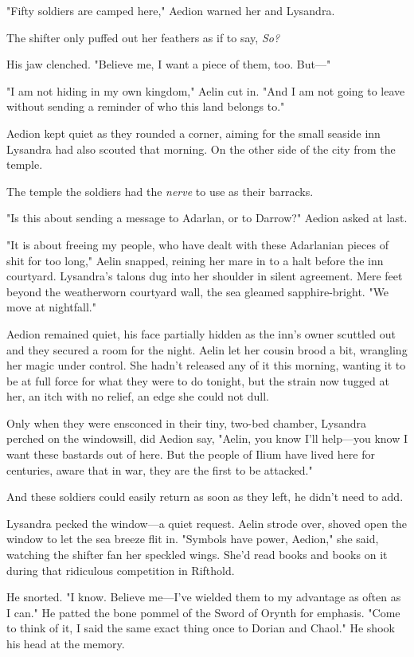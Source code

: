 "Fifty soldiers are camped here," Aedion warned her and Lysandra.

The shifter only puffed out her feathers as if to say, \emph{So?}

His jaw clenched.
"Believe me, I want a piece of them, too.
But---"

"I am not hiding in my own kingdom," Aelin cut in.
"And I am not going to leave without sending a reminder of who this land belongs to."

Aedion kept quiet as they rounded a corner, aiming for the small seaside inn Lysandra had also scouted that morning.
On the other side of the city from the temple.

The temple the soldiers had the \emph{nerve} to use as their barracks.

"Is this about sending a message to Adarlan, or to Darrow?"
Aedion asked at last.

"It is about freeing my people, who have dealt with these Adarlanian pieces of shit for too long," Aelin snapped, reining her mare in to a halt before the inn courtyard.
Lysandra's talons dug into her shoulder in silent agreement.
Mere feet beyond the weatherworn courtyard wall, the sea gleamed sapphire-bright.
"We move at nightfall."

Aedion remained quiet, his face partially hidden as the inn's owner scuttled out and they secured a room for the night.
Aelin let her cousin brood a bit, wrangling her magic under control.
She hadn't released any of it this morning, wanting it to be at full force for what they were to do tonight, but the strain now tugged at her, an itch with no relief, an edge she could not dull.

Only when they were ensconced in their tiny, two-bed chamber, Lysandra perched on the windowsill, did Aedion say, "Aelin, you know I'll help---you know I want these bastards out of here.
But the people of Ilium have lived here for centuries, aware that in war, they are the first to be attacked."

And these soldiers could easily return as soon as they left, he didn't need to add.

Lysandra pecked the window---a quiet request.
Aelin strode over, shoved open the window to let the sea breeze flit in.
"Symbols have power, Aedion," she said, watching the shifter fan her speckled wings.
She'd read books and books on it during that ridiculous competition in Rifthold.

He snorted.
"I know.
Believe me---I've wielded them to my advantage as often as I can."
He patted the bone pommel of the Sword of Orynth for emphasis.
"Come to think of it, I said the same exact thing once to Dorian and Chaol."
He shook his head at the memory.

